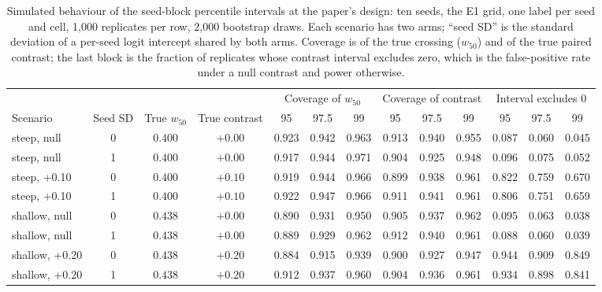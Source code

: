 \begin{table}[H]
\caption{Simulated behaviour of the seed-block percentile intervals at the paper's design: ten seeds, the E1 grid, one label per seed and cell, 1,000 replicates per row, 2,000 bootstrap draws. Each scenario has two arms; ``seed SD'' is the standard deviation of a per-seed logit intercept shared by both arms. Coverage is of the true crossing ($w_{50}$) and of the true paired contrast; the last block is the fraction of replicates whose contrast interval excludes zero, which is the false-positive rate under a null contrast and power otherwise.}
\label{tab:coverage}
\centering\scriptsize\setlength{\tabcolsep}{3pt}
\begin{tabular}{@{}lcccccccccccc@{}}
\toprule
& & & & \multicolumn{3}{c}{Coverage of $w_{50}$} & \multicolumn{3}{c}{Coverage of contrast} & \multicolumn{3}{c}{Interval excludes 0} \\
\cmidrule(lr){5-7}\cmidrule(lr){8-10}\cmidrule(l){11-13}
Scenario & Seed SD & True $w_{50}$ & True contrast & 95 & 97.5 & 99 & 95 & 97.5 & 99 & 95 & 97.5 & 99 \\
\midrule
steep, null & 0 & $0.400$ & $+0.00$ & 0.923 & 0.942 & 0.963 & 0.913 & 0.940 & 0.955 & 0.087 & 0.060 & 0.045 \\
steep, null & 1 & $0.400$ & $+0.00$ & 0.917 & 0.944 & 0.971 & 0.904 & 0.925 & 0.948 & 0.096 & 0.075 & 0.052 \\
steep, +0.10 & 0 & $0.400$ & $+0.10$ & 0.919 & 0.944 & 0.966 & 0.899 & 0.938 & 0.961 & 0.822 & 0.759 & 0.670 \\
steep, +0.10 & 1 & $0.400$ & $+0.10$ & 0.922 & 0.947 & 0.966 & 0.911 & 0.941 & 0.961 & 0.806 & 0.751 & 0.659 \\
shallow, null & 0 & $0.438$ & $+0.00$ & 0.890 & 0.931 & 0.950 & 0.905 & 0.937 & 0.962 & 0.095 & 0.063 & 0.038 \\
shallow, null & 1 & $0.438$ & $+0.00$ & 0.889 & 0.929 & 0.962 & 0.912 & 0.940 & 0.961 & 0.088 & 0.060 & 0.039 \\
shallow, +0.20 & 0 & $0.438$ & $+0.20$ & 0.884 & 0.915 & 0.939 & 0.900 & 0.927 & 0.947 & 0.944 & 0.909 & 0.849 \\
shallow, +0.20 & 1 & $0.438$ & $+0.20$ & 0.912 & 0.937 & 0.960 & 0.904 & 0.936 & 0.961 & 0.934 & 0.898 & 0.841 \\
\bottomrule
\end{tabular}
\end{table}
